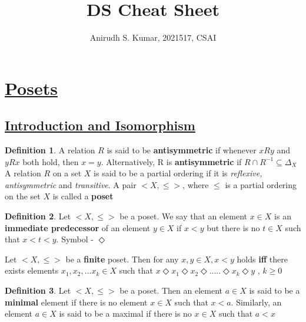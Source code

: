 \documentclass{article}
\title{DS Cheat Sheet}
\author{Anirudh S. Kumar, 2021517, CSAI}
\theoremstyle{definition}
\newtheorem*{defi}{Definition}
\theoremstyle{definition}
\newenvironment{manualprop}[1]{%
  \renewcommand\themanualpropinner{#1}%
  \manualpropinner
}{\endmanualpropinner}
\theoremstyle{named}
\begin{document}
\maketitle
\pagestyle{fancy}
\fancyhf{}
\renewcommand{\headrulewidth}{0pt}
\fancyfoot[C]{\thepage}


\section{\underline{Posets}}
\subsection{\underline{Introduction and Isomorphism}}

\begin{defi}
A relation $R$ is said to be \textbf{{antisymmetric}} if whenever $xRy$ and $yRx$ both hold, then $x = y$.
Alternatively, R is \textbf{{antisymmetric}} if $R \cap R^{-1} \subseteq \Delta_{X}$ \newline
A relation $R$ on a set $X$ is said to be a partial ordering if it is \emph{reflexive, antisymmetric} and \emph{transitive}.  
\newline
A pair $<X, \leq>$, where $\leq$ is a partial ordering on the set $X$ is called a \textbf{poset}
\end{defi}

\begin{defi}
Let $<X, \leq >$ be a poset. We say that an element $x \in X$ is an \textbf{immediate predecessor} of an element $y \in X$ if $x < y$ but there is no $t \in X$ such that $x < t < y$. Symbol - $\Diamond$ 
\end{defi}

\begin{manualprop}{4}
Let $<X, \leq >$ be a \textbf{finite} poset. Then for any $x, y \in X, x < y$ holds \textbf{iff} there exists elements $x_1, x_2, ... x_k \in X$ such that $x \Diamond x_1  \Diamond x_2  \Diamond  .....  \Diamond x_k  \Diamond y$ , $k\geq 0$
\end{manualprop}

\begin{defi}
Let $<X, \leq >$ be a poset. Then an element $a \in X$ is said to be a \textbf{minimal} element if there is no element $x \in X$ such that $x < a$. Similarly, an element $a \in X$ is said to be a maximal if there is no $x \in X$ such that  $a < x$
\end{defi}
\end{document}
